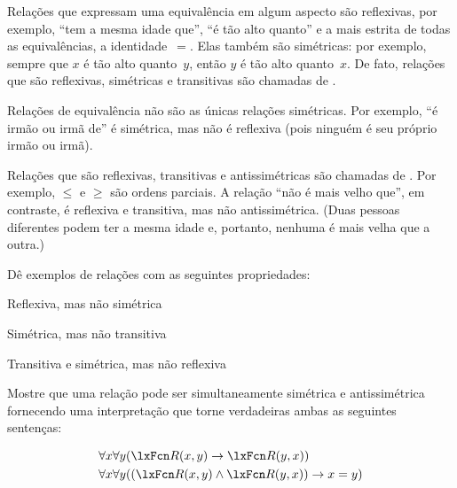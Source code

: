 Relações que expressam uma equivalência em algum aspecto são reflexivas, por exemplo, \textquotedblleft tem a mesma idade que\textquotedblright{}, \textquotedblleft é tão alto quanto\textquotedblright{} e a mais estrita de todas as equivalências, a identidade~$=$. Elas também são simétricas: por exemplo, sempre que $x$ é tão alto quanto~$y$, então $y$ é tão alto quanto~$x$. De fato, relações que são reflexivas, simétricas e transitivas são chamadas de .






Relações de equivalência não são as únicas relações simétricas. Por exemplo, \textquotedblleft é irmão ou irmã de\textquotedblright{} é simétrica, mas não é reflexiva (pois ninguém é seu próprio irmão ou irmã).



Relações que são reflexivas, transitivas e antissimétricas são chamadas de . Por exemplo, $\le$ e $\ge$ são ordens parciais. A relação \textquotedblleft não é mais velho que\textquotedblright{}, em contraste, é reflexiva e transitiva, mas não antissimétrica. (Duas pessoas diferentes podem ter a mesma idade e, portanto, nenhuma é mais velha que a outra.)






\practiceproblems

\problempart
Dê exemplos de relações com as seguintes propriedades:
\begin{compactlist}
\item Reflexiva, mas não simétrica
\item Simétrica, mas não transitiva
\item Transitiva e simétrica, mas não reflexiva
\end{compactlist}

\problempart
Mostre que uma relação pode ser simultaneamente simétrica e antissimétrica fornecendo uma interpretação que torne verdadeiras ambas as seguintes sentenças:


\begin{align*}
	& \forall x\forall y(\atom{R}{x,y} \eif \atom{R}{y,x})\\
	& \forall x\forall y((\atom{R}{x,y} \eand \atom{R}{y,x}) \eif x=y)
\end{align*}
